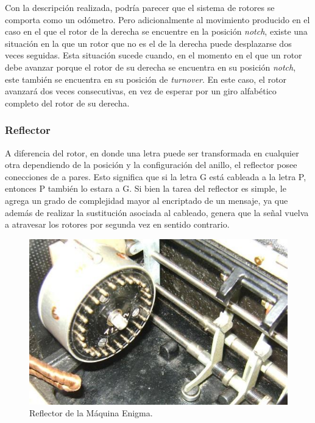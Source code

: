 \documentclass[a4paper,10pt]{article}
\begin{document}
Con la descripción realizada, podría parecer que el sistema de rotores se comporta como un odómetro. Pero adicionalmente al movimiento producido en el caso en el que el rotor de la derecha se encuentre en la posición \textit{notch}, existe una situación en la que un rotor que no es el de la derecha puede desplazarse dos veces seguidas. Esta situación sucede cuando, en el momento en el que un rotor debe avanzar porque el rotor de su derecha se encuentra en su posición \textit{notch}, este también se encuentra en su posición de \textit{turnover}. En este caso, el rotor avanzará dos veces consecutivas, en vez de esperar por un giro alfabético completo del rotor de su derecha.   

\subsubsection{Reflector}

A diferencia del rotor, en donde una letra puede ser transformada en cualquier otra dependiendo de la posición y la configuración del anillo, el reflector posee conecciones de a pares. Esto significa que si la letra G está cableada a la letra P, entonces P también lo estara a G. Si bien la tarea del reflector es simple, le agrega un grado de complejidad mayor al encriptado de un mensaje, ya que además de realizar la sustitución asociada al cableado, genera que la señal vuelva a atravesar los rotores por segunda vez en sentido contrario.

\begin{figure}[H]
    \centering
    \includegraphics[scale=0.3]{reflector.jpg}
    \caption{Reflector de la Máquina Enigma.\cite{rijmenants}}
    \label{fig:my_label}
\end{figure}
\end{document}
